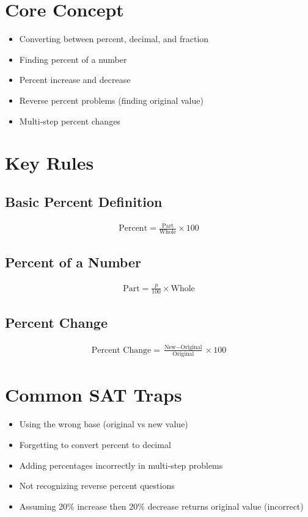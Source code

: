 

\section*{Core Concept}
\begin{itemize}
    \item Converting between percent, decimal, and fraction
    \item Finding percent of a number
    \item Percent increase and decrease
    \item Reverse percent problems (finding original value)
    \item Multi-step percent changes
\end{itemize}

\section*{Key Rules}

\subsection*{Basic Percent Definition}
\begin{align*}
\text{Percent} = \frac{\text{Part}}{\text{Whole}} \times 100
\end{align*}

\subsection*{Percent of a Number}
\begin{align*}
\text{Part} = \frac{p}{100} \times \text{Whole}
\end{align*}

\subsection*{Percent Change}
\begin{align*}
\text{Percent Change} = \frac{\text{New} - \text{Original}}{\text{Original}} \times 100
\end{align*}

\section*{Common SAT Traps}
\begin{itemize}
    \item Using the wrong base (original vs new value)
    \item Forgetting to convert percent to decimal
    \item Adding percentages incorrectly in multi-step problems
    \item Not recognizing reverse percent questions
    \item Assuming 20\% increase then 20\% decrease returns original value (incorrect)
\end{itemize}


